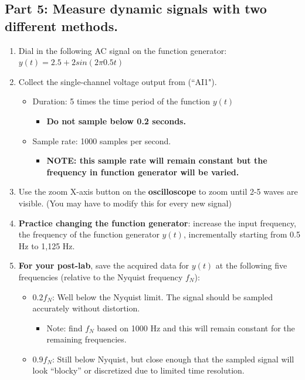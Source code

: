 \documentclass{article} %
\begin{document}
\subsection{Part 5: Measure dynamic signals with two different methods.}
\begin{enumerate}
    \item Dial in the following AC signal on the function generator: $y(t) =2.5+ 2sin(2 \pi 0.5 t)$
    \item Collect the single-channel voltage output from (``AI1").
    \begin{itemize}
        \item Duration: 5 times the time period of the function $y(t)$
        \begin{itemize}
            \item \textbf{Do not sample below 0.2 seconds.}
        \end{itemize}
        \item Sample rate: 1000 samples per second.
        \begin{itemize}
            \item \textbf{NOTE: this sample rate will remain constant but the frequency in function generator will be varied.}
        \end{itemize}
    \end{itemize}
    \item Use the zoom X-axis button on the \textbf{oscilloscope} to zoom until 2-5 waves are visible. (You may have to modify this for every new signal)
    \item \textbf{Practice changing the function generator}: increase the input frequency, the frequency of the function generator $y(t)$, incrementally starting from 0.5 Hz to 1,125 Hz.

    \item \textbf{For your post-lab}, save the acquired data for $y(t)$ at the following five frequencies (relative to the Nyquist frequency $f_N$):
        \begin{itemize}
            \item $0.2 f_N$: Well below the Nyquist limit. The signal should be sampled accurately without distortion.
            \begin{itemize}
                \item Note: find $f_N$ based on 1000 Hz and this will remain constant for the remaining frequencies.
            \end{itemize}
            
            \item $0.9 f_N$: Still below Nyquist, but close enough that the sampled signal will look ``blocky'' or discretized due to limited time resolution.
            

\end{itemize}
\end{enumerate}
\end{document}
